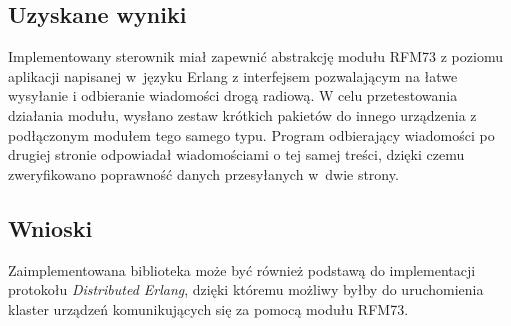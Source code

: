 \subsection{Uzyskane wyniki}

Implementowany sterownik miał zapewnić abstrakcję modułu RFM73 z poziomu aplikacji napisanej w~języku Erlang z interfejsem pozwalającym na łatwe wysyłanie i odbieranie wiadomości drogą radiową. W celu przetestowania działania modułu, wysłano zestaw krótkich pakietów do innego urządzenia z podłączonym modułem tego samego typu. Program odbierający wiadomości po drugiej stronie odpowiadał wiadomościami o tej samej treści, dzięki czemu zweryfikowano poprawność danych przesyłanych w~dwie strony.


\subsection{Wnioski}

Zaimplementowana biblioteka może być również podstawą do implementacji protokołu \emph{Distributed Erlang}, dzięki któremu możliwy byłby do uruchomienia klaster urządzeń komunikujących się za pomocą modułu RFM73.